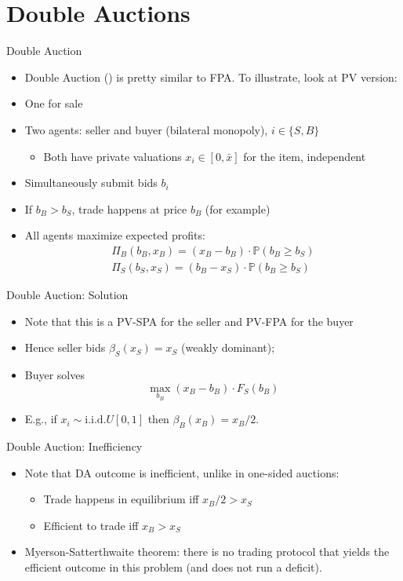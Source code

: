 \documentclass[english,10pt
,aspectratio=169
]{beamer}
\begin{document}
\section{Double Auctions}

\begin{frame}{Double Auction}
	\begin{itemize}
		\item Double Auction (\cite{chatterjee_bargaining_1983}) is pretty similar to FPA. To illustrate, look at PV version:
		\item One  for sale
		\item Two agents: seller and buyer (bilateral monopoly), $i \in \{S,B\}$
		\begin{itemize}
			\item Both have private valuations $x_i \in [0,\bar{x}]$ for the item, independent
		\end{itemize}
		\item Simultaneously submit bids $b_i$
		\item If $b_B > b_S$, trade happens at price $b_B$ (for example)
		\item All agents maximize expected profits:
		\begin{align*}
			\Pi_B(b_B,x_B) = \left( x_B - b_B \right) \cdot \mathbb{P} \left( b_B \geq b_S \right) 
			\\
			\Pi_S(b_S,x_S) = \left( b_B - x_S \right) \cdot \mathbb{P} \left( b_B \geq b_S \right) 
		\end{align*}
	\end{itemize}
\end{frame}


\begin{frame}{Double Auction: Solution}
	\begin{itemize}
		\item Note that this is a PV-SPA for the seller and PV-FPA for the buyer
		\item Hence seller bids $\beta_S(x_S) = x_S$ (weakly dominant);
		\item Buyer solves
		\[ \max_{b_B} \left( x_B - b_B \right) \cdot F_S(b_B) \]
		\item E.g., if $x_i \sim \text{i.i.d.} U[0,1]$ then $\beta_B(x_B) = x_B/2$.
	\end{itemize}
\end{frame}


\begin{frame}{Double Auction: Inefficiency}
	\begin{itemize}
		\item Note that DA outcome is \alert{inefficient}, unlike in one-sided auctions:
		\begin{itemize}
			\item Trade happens in equilibrium iff $x_B/2 > x_S$
			\item Efficient to trade iff $x_B > x_S$
		\end{itemize}
		\item Myerson-Satterthwaite theorem: there is no trading protocol that yields the efficient outcome in this problem (and does not run a deficit).
	\end{itemize}
\end{frame}
\end{document}
